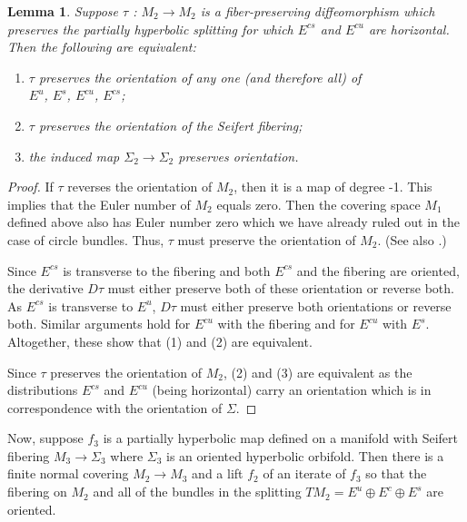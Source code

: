 \documentclass[11pt]{amsart} %
\newcommand{\Es}{E^s}
\newcommand{\Ec}{E^c}
\newcommand{\Eu}{E^u}
\newcommand{\Ecu}{E^{cu}}
\newcommand{\Ecs}{E^{cs}}
\newcommand{\Sig}{\Sigma}
\numberwithin{equation}{section}
\newtheorem{lemma}[equation]{Lemma}
\theoremstyle{remark}
\begin{document}
\begin{lemma} \label{lemma:orient}
    Suppose $\tau$ : $M_2  \to  M_2$ is a fiber-preserving diffeomorphism
    which preserves the partially hyperbolic splitting for which $\Ecs$ and $\Ecu$ are horizontal.
    Then the following are equivalent:{}
    \begin{enumerate}
        \item $\tau$ preserves the orientation of any one (and therefore all)
        of\\
        $\Eu$, $\Es$, $\Ecu$, $\Ecs$;

        \item $\tau$ preserves the orientation of the Seifert fibering;

        \item the induced map $\Sig_2  \to  \Sig_2$ preserves orientation.
          \end{enumerate}  \end{lemma}
\begin{proof}
    If $\tau$ reverses the orientation of $M_2$,
    then it is a map of degree -1.
    This implies that the Euler number of $M_2$ equals zero.
    Then the covering space $M_1$ defined above
    also has Euler number zero
    which we have already ruled out in the case of circle bundles.
    Thus, $\tau$ must preserve the orientation of $M_2$.
    (See also \cite[Theorem 3.1]{ehn1981transverse}.)

    Since $\Ecs$ is transverse to the fibering
    and both $\Ecs$ and the fibering are oriented,
    the derivative $D \tau$ must either preserve both of these orientation
    or reverse both.
    As $\Ecs$ is transverse to $\Eu$,
    $D \tau$ must either preserve both orientations or reverse both.
    Similar arguments
    hold for $\Ecu$ with the fibering and for $\Ecu$ with $\Es$.
    Altogether, these show that (1) and (2) are equivalent.

    Since $\tau$ preserves the orientation of $M_2$, (2) and (3) are equivalent as the distributions $\Ecs$ and $\Ecu$ (being horizontal) carry an orientation which is in correspondence with the orientation of $\Sigma$.
\end{proof}
Now, suppose $f_3$ is a partially hyperbolic map defined on a
manifold with Seifert fibering $M_3  \to  \Sig_3$
where $\Sig_3$ is an oriented hyperbolic orbifold.
Then there is a finite normal covering $M_2  \to  M_3$
and a lift $f_2$ of an iterate of $f_3$ so that the fibering on $M_2$
and all of the bundles
in the splitting $TM_2 = \Eu \oplus \Ec \oplus \Es$ are oriented.
\end{document}
